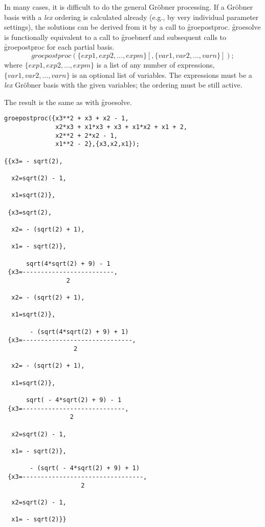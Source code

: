 \hypertarget{operator:GROEPOSTPROC}{}
In many cases, it is difficult to do the general Gr\"obner processing.
If a Gr\"obner basis with a {\it lex} ordering is calculated already (e.g.,
by very individual parameter settings), the solutions can be derived
from it by a call to \f{groepostproc}. \f{groesolve} is functionally
equivalent to a call to \f{groebnerf} and subsequent calls to
\f{groepostproc} for each partial basis.
\[
 groepostproc(\{exp1, exp2, \ldots , expm\}[,\{var1, var2, \ldots ,
varn\}]);
\]
where $\{exp1, exp2, \ldots , expm\}$ is a list of any number of
expressions, \linebreak[4] $\{var1, var2, \ldots, varn\}$ is an
optional list of variables. The expressions must be a {\it lex} Gr\"obner
basis with the given variables; the ordering must be still active.

The result is the same as with \f{groesolve}.

\begin{verbatim}
groepostproc({x3**2 + x3 + x2 - 1,
              x2*x3 + x1*x3 + x3 + x1*x2 + x1 + 2,
              x2**2 + 2*x2 - 1,
              x1**2 - 2},{x3,x2,x1});

{{x3= - sqrt(2),

  x2=sqrt(2) - 1,

  x1=sqrt(2)},

 {x3=sqrt(2),

  x2= - (sqrt(2) + 1),

  x1= - sqrt(2)},

      sqrt(4*sqrt(2) + 9) - 1
 {x3=-------------------------,
                 2

  x2= - (sqrt(2) + 1),

  x1=sqrt(2)},

       - (sqrt(4*sqrt(2) + 9) + 1)
 {x3=------------------------------,
                   2

  x2= - (sqrt(2) + 1),

  x1=sqrt(2)},

      sqrt( - 4*sqrt(2) + 9) - 1
 {x3=----------------------------,
                  2

  x2=sqrt(2) - 1,

  x1= - sqrt(2)},

       - (sqrt( - 4*sqrt(2) + 9) + 1)
 {x3=---------------------------------,
                     2

  x2=sqrt(2) - 1,

  x1= - sqrt(2)}}
\end{verbatim}

